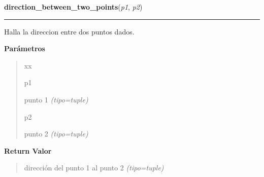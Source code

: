 \hspace{.8\funcindent}\begin{boxedminipage}{\funcwidth}

    \raggedright \textbf{direction\_between\_two\_points}(\textit{p1}, \textit{p2})

    \vspace{-1.5ex}

    \rule{\textwidth}{0.5\fboxrule}
\setlength{\parskip}{2ex}
Halla la direccion entre dos puntos dados.

\setlength{\parskip}{1ex}
      \textbf{Parámetros}
      \vspace{-1ex}

      \begin{quote}
        \begin{Ventry}{xx}

          \item[p1]


punto 1
            {\it (tipo=tuple)}

          \item[p2]


punto 2
            {\it (tipo=tuple)}

        \end{Ventry}

      \end{quote}

      \textbf{Return Valor}
    \vspace{-1ex}

      \begin{quote}

dirección del punto 1 al punto 2
      {\it (tipo=tuple)}

      \end{quote}

    \end{boxedminipage}

    \label{src:functions:get_max_edge}

    \vspace{0.5ex}

